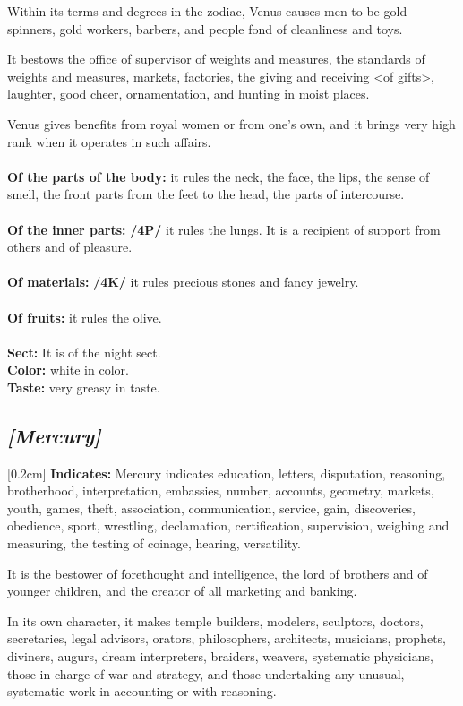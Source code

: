 \mndl[0.2cm]
Within its terms and degrees in the zodiac, Venus causes men to be gold-spinners, gold workers, barbers, and people fond of cleanliness and toys. 

It bestows the office of supervisor of weights and measures, the standards of weights and measures, markets, factories, the giving and receiving <of gifts>, laughter, good cheer, ornamentation, and hunting in moist places.

Venus gives benefits from royal women or from one’s own, and it brings very high rank when it operates in such affairs. \\
\\
\textbf{Of the parts of the body:} it rules the neck, the face, the lips, the sense of smell, the front parts from the feet to the head, the parts of intercourse. \\
\\
\textbf{Of the inner parts:} \textbf{/4P/} it rules the lungs. It is a recipient of support from others and of pleasure.\\ 
\\
\textbf{Of materials:} \textbf{/4K/} it rules precious
stones and fancy jewelry. \\
\\ 
\textbf{Of fruits:} it rules the olive. \\
\\
\textbf{Sect:} It is of the night sect.\\
\textbf{Color:} white in color. \\
\textbf{Taste:} very greasy in taste.

\secbr
\subsection{\textit{[Mercury]}}
[0.2cm]
\noindent
\textbf{Indicates:}  Mercury indicates education, letters, disputation, reasoning, brotherhood, interpretation, embassies, number, accounts, geometry, markets, youth, games, theft, association, communication, service, gain, discoveries, obedience, sport, wrestling, declamation, certification, supervision, weighing and measuring, the testing of coinage, hearing, versatility. 

It is the bestower of forethought and intelligence, the lord of brothers and of younger children, and the creator of all marketing and banking. 

In its own character, it makes temple builders, modelers, sculptors, doctors, secretaries, legal advisors, orators, philosophers, architects, musicians, prophets, diviners, augurs, dream interpreters, braiders, weavers, systematic physicians, those in charge of war and strategy, and those undertaking any unusual, systematic work in accounting or with reasoning. 

